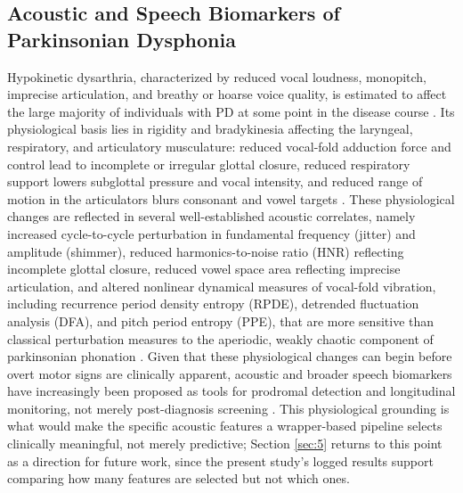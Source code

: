 \subsection{Acoustic and Speech Biomarkers of Parkinsonian Dysphonia} \label{sec:2.2}
Hypokinetic dysarthria, characterized by reduced vocal loudness, monopitch, imprecise articulation, and breathy or hoarse voice quality, is estimated to affect the large majority of individuals with PD at some point in the disease course \cite{Ho:1999, Cao:2025}. Its physiological basis lies in rigidity and bradykinesia affecting the laryngeal, respiratory, and articulatory musculature: reduced vocal-fold adduction force and control lead to incomplete or irregular glottal closure, reduced respiratory support lowers subglottal pressure and vocal intensity, and reduced range of motion in the articulators blurs consonant and vowel targets \cite{Yang:2020}. These physiological changes are reflected in several well-established acoustic correlates, namely increased cycle-to-cycle perturbation in fundamental frequency (jitter) and amplitude (shimmer), reduced harmonics-to-noise ratio (HNR) reflecting incomplete glottal closure, reduced vowel space area reflecting imprecise articulation, and altered nonlinear dynamical measures of vocal-fold vibration, including recurrence period density entropy (RPDE), detrended fluctuation analysis (DFA), and pitch period entropy (PPE), that are more sensitive than classical perturbation measures to the aperiodic, weakly chaotic component of parkinsonian phonation \cite{Yang:2020}. Given that these physiological changes can begin before overt motor signs are clinically apparent, acoustic and broader speech biomarkers have increasingly been proposed as tools for prodromal detection and longitudinal monitoring, not merely post-diagnosis screening \cite{Rusz:2024, Cao:2025}. This physiological grounding is what would make the specific acoustic features a wrapper-based pipeline selects clinically meaningful, not merely predictive; Section \ref{sec:5} returns to this point as a direction for future work, since the present study's logged results support comparing how many features are selected but not which ones.

